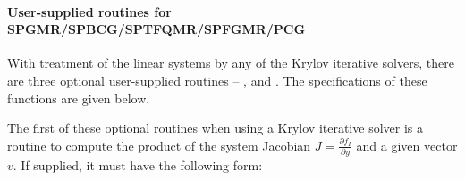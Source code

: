 \documentclass[letterpaper,10pt,english]{sphinxmanual}
\begin{document}
\paragraph{User-supplied routines for SPGMR/SPBCG/SPTFQMR/SPFGMR/PCG}
\label{f_interface/Usage:user-supplied-routines-for-spgmr-spbcg-sptfqmr-spfgmr-pcg}\label{f_interface/Usage:finterface-spilsusersupplied}
With treatment of the linear systems by any of the Krylov iterative
solvers, there are three optional user-supplied routines --
{\hyperref[f_interface/Usage:f/_/FARKJTIMES]{\emph{}}}, {\hyperref[f_interface/Usage:f/_/FARKPSET]{\emph{}}} and {\hyperref[f_interface/Usage:f/_/FARKPSOL]{\emph{}}}.
The specifications of these functions are given below.

The first of these optional routines when using a Krylov iterative
solver is a routine to compute the product of the system Jacobian
\(J = \frac{\partial f_I}{\partial y}\) and a given vector
\(v\).  If supplied, it must have the following form:
\end{document}
